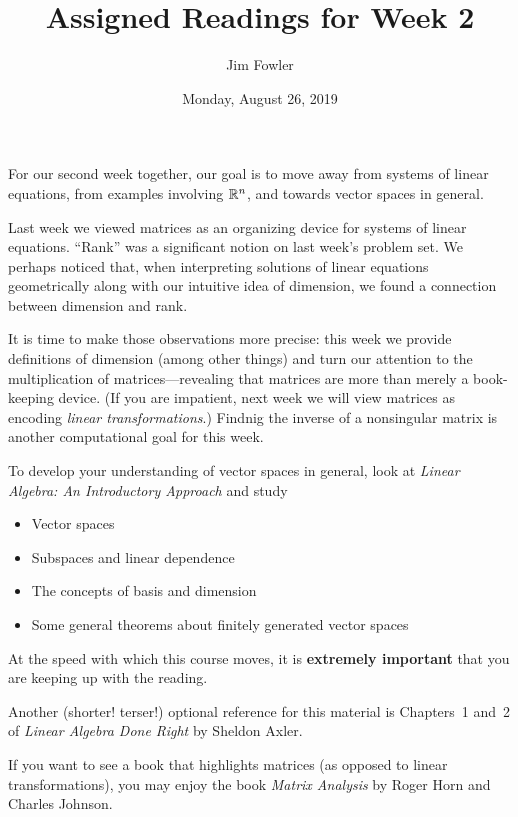\documentclass{homework}
\author{Jim Fowler}
\title{Assigned Readings for Week 2}
\date{Monday, August 26, 2019}
\begin{document}
\maketitle

For our second week together, our goal is to move away from systems of
linear equations, from examples involving $\mathbb{R}^n$, and towards vector
spaces in general.

Last week we viewed matrices as an organizing device for systems of
linear equations.  ``Rank'' was a significant notion on last week's
problem set.  We perhaps noticed that, when interpreting solutions of
linear equations geometrically along with our intuitive idea of
dimension, we found a connection between dimension and rank.

It is time to make those observations more precise: this week we
provide definitions of dimension (among other things) and turn our
attention to the multiplication of matrices---revealing that matrices
are more than merely a book-keeping device.  (If you are impatient,
next week we will view matrices as encoding \textit{linear
  transformations}.)  Findnig the inverse of a nonsingular matrix is
another computational goal for this week.

To develop your understanding of vector spaces in general, look at
\textit{Linear Algebra: An Introductory Approach} and study
\begin{itemize}
\item {} Vector spaces
\item {} Subspaces and linear dependence
\item {} The concepts of basis and dimension
\item {} Some general theorems about finitely generated vector spaces
\end{itemize}
At the speed with which this course moves, it is \textbf{extremely
  important} that you are keeping up with the reading.

Another (shorter!  terser!) optional reference for this material is
Chapters~1 and~2 of \textit{Linear Algebra Done Right} by Sheldon
Axler.

If you want to see a book that highlights matrices (as opposed to
linear transformations), you may enjoy the book \textit{Matrix
  Analysis} by Roger Horn and Charles Johnson.
\end{document}
